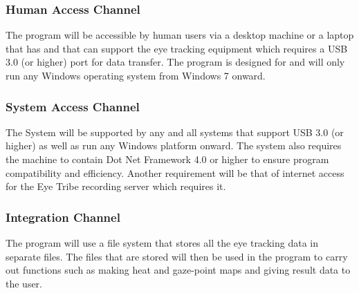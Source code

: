 

\subsubsection{Human Access Channel}
    The program will be accessible by human users via a desktop machine or a laptop that has and that can support the eye tracking equipment which requires a USB 3.0 (or higher) port for data transfer. The program is designed for and will only run any Windows operating system from Windows 7 onward.
    
\subsubsection{System Access Channel}
    The System will be supported by any and all systems that support USB 3.0 (or higher) as well as run any Windows platform onward. The system also requires the machine to contain Dot Net Framework 4.0 or higher to ensure program compatibility and efficiency. Another requirement will be that of internet access for the Eye Tribe recording server which requires it.
    
\subsubsection{Integration Channel}
The program will use a file system that stores all the eye tracking data in separate files. The files that are stored will then be used in the program to carry out functions such as making heat and gaze-point maps and giving result data to the user. 